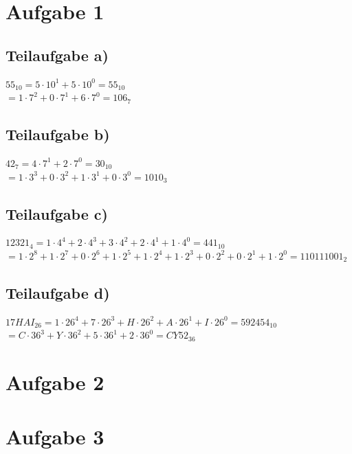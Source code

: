 \documentclass{llncs}
\begin{document}
\section*{Aufgabe 1}

\subsection*{Teilaufgabe a)}

$55_{10} = 5 \cdot 10^1 + 5 \cdot 10^0 = 55_{10}$\\
$= 1 \cdot 7^2 + 0 \cdot 7^1 + 6 \cdot 7^0 = 106_{7}$

\subsection*{Teilaufgabe b)}

$42_{7} = 4 \cdot 7^1 + 2 \cdot 7^0 = 30_{10}$\\
$= 1 \cdot 3^3 + 0 \cdot 3^2 + 1 \cdot 3^1 + 0 \cdot 3^0 = 1010_{3}$

\subsection*{Teilaufgabe c)}

$12321_{4} = 1 \cdot 4^4 + 2 \cdot 4^3 + 3 \cdot 4^2 + 2 \cdot 4^1 +1 \cdot 4^0 = 441_{10}$\\
$= 1 \cdot 2^8 + 1 \cdot 2^7 + 0 \cdot 2^6 + 1 \cdot 2^5 + 1 \cdot 2^4 + 1 \cdot 2^3 + 0 \cdot 2^2 + 0 \cdot 2^1 + 1 \cdot 2^0 = 110111001_{2}$

\subsection*{Teilaufgabe d)}

$17HAI_{26} = 1 \cdot 26^4 + 7 \cdot 26^3 + H \cdot 26^2 + A \cdot 26^1 + I \cdot 26^0 = 592454_{10}$\\
$= C \cdot 36^3 + Y \cdot 36^2 + 5 \cdot 36^1 + 2 \cdot 36^0 = CY52_{36}$

\section*{Aufgabe 2}

\section*{Aufgabe 3}
\end{document}
